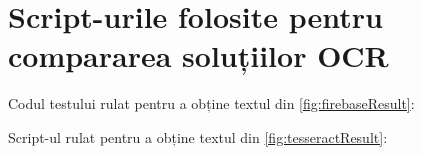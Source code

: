 \chapter{Script-urile folosite pentru compararea soluțiilor OCR}\label{apx:Anexa1}

Codul testului rulat pentru a obține textul din \ref{fig:firebaseResult}:



Script-ul rulat pentru a obține textul din \ref{fig:tesseractResult}:


